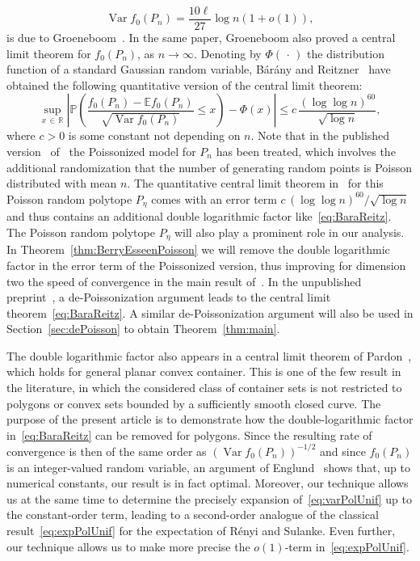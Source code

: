 \documentclass[AHL,Unicode,longabstracts,published]{cedram}
\newcommand{\var}{\operatorname{Var}}
\newcommand{\bbR}{\mathbb{R}}
\newcommand{\bbE}{\mathbb{E}}
\newcommand{\bbP}{\mathbb{P}}
\begin{document}
\begin{equation}\label{eq:varPolUnif}
\var f_0(P_n)=\frac{10\ell}{27}\log n (1+o(1)),
\end{equation}
is due to Groeneboom~\cite{Gro88}. In the same paper, Groeneboom also proved a central limit theorem for $f_0(P_n)$, as $n\to\infty$. Denoting by $\Phi(\,\cdot\,)$ the distribution function of a standard Gaussian random variable, Bárány and Reitzner~\cite{BR06} have obtained the following quantitative version of the central limit theorem:
\begin{equation}\label{eq:BaraReitz}
\sup_{x\,\in\,\bbR}\left|\bbP\left(\frac{f_0(P_n)-\bbE f_0(P_n)}{\sqrt{\var f_0(P_n)}}\leq x\right)-\Phi(x)\right|\leq c\,\frac{(\log\log n)^{60}}{\sqrt{\log n}},
\end{equation}
where $c>0$ is some constant not depending on $n$. Note that in the published version~\cite{BR10} of~\cite{BR06} the Poissonized model for $P_n$ has been treated, which involves the additional randomization that the number of generating random points is Poisson distributed with mean $n$. The quantitative central limit theorem in~\cite{BR10} for this Poisson random polytope $P_\eta$ comes with an error term $c\, (\log\log n)^{60}/ \sqrt{\log n} $ and thus contains an additional double logarithmic factor like~\eqref{eq:BaraReitz}. The Poisson random polytope $P_\eta$ will also play a prominent role in our analysis. In Theorem~\ref{thm:BerryEsseenPoisson} we will remove the double logarithmic factor in the error term of the Poissonized version, thus improving for dimension two the speed of convergence in the main result of~\cite{BR10}. In the unpublished preprint~\cite{BR06}, a de-Poissonization argument leads to the central limit theorem~\eqref{eq:BaraReitz}. A similar de-Poissonization argument will also be used in Section~\ref{sec:dePoisson} to obtain Theorem~\ref{thm:main}.

The double logarithmic factor also appears in a central limit theorem of Pardon~\cite{Pardon1, Pardon2}, which holds for general planar convex container. This is one of the few result in the literature, in which the considered class of container sets is not restricted to polygons or convex sets bounded by a sufficiently smooth closed curve. The purpose of the present article is to demonstrate how the double-logarithmic factor in~\eqref{eq:BaraReitz} can be removed for polygons. Since the resulting rate of convergence is then of the same order as $(\var f_0(P_n))^{-1/2}$ and since $f_0(P_n)$ is an integer-valued random variable, an argument of Englund~\cite[Section~6]{Englund} shows that, up to numerical constants, our result is in fact optimal. Moreover, our technique allows us at the same time to determine the precisely expansion of~\eqref{eq:varPolUnif} up to the constant-order term, leading to a second-order analogue of the classical result~\eqref{eq:expPolUnif} for the expectation of Rényi and Sulanke. Even further, our technique allows us to make more precise the $o(1)$-term in~\eqref{eq:expPolUnif}.
\end{document}
